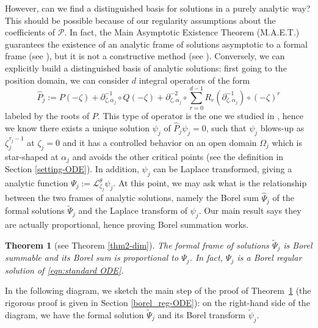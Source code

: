 \documentclass{article}
\theoremstyle{definition}
\newcommand{\series}[1]{\tilde{#1}}
\newcommand{\laplace}{\mathcal{L}}
\theoremstyle{plain}
\newtheorem{theorem}{Theorem}[section]
\begin{document}
However, can we find a distinguished basis for solutions in a purely analytic way? This should be possible because of our regularity assumptions about the coefficients of $\mathcal{P}$. In fact, the Main Asymptotic Existence Theorem (M.A.E.T.) guarantees the existence of an analytic frame of solutions asymptotic to a formal frame (see \cite[Theorem 3.1]{diverg-resurg-iii}), but it is not a constructive method (see \cite[Chapter 14]{balser}). Conversely, we can explicitly build a distinguished basis of analytic solutions: first going to the position domain, we can consider $d$ integral operators of the form 
\begin{equation}
\hat{P}_j:=P(-\zeta)+\partial_{\zeta,\alpha_j}^{-1}\circ Q(-\zeta)+\partial_{\zeta,\alpha_j}^{-2}\circ\sum_{r=0}^{d-1}R_r(\partial_{\zeta,\alpha_j}^{-1})\circ (-\zeta)^r
\end{equation}
labeled by the roots of $P$. This type of operator is the one we studied in \cite{reg-sing-volterra}, hence we know there exists a unique solution $\psi_j$ of $\hat{P}_j\psi_j=0$, such that $\psi_j$ blows-up as $\zeta_j^{\tau_j-1}$ at $\zeta_j=0$ and it has a controlled behavior on an open domain $\Omega_j$ which is star-shaped at $\alpha_j$ and avoids the other critical points (see the definition in Section \ref{setting-ODE}). In addition, $\psi_j$ can be Laplace transformed, giving a analytic function $\Psi_j:=\laplace_{\zeta_j}^{\theta}\psi_j$. 
At this point, we may ask what is the relationship between the two frames of analytic solutions, namely the Borel sum $\hat{\Psi}_j$ of the formal solutions $\series{\Psi}_j$ and the Laplace transform of $\psi_j$. Our main result says they are actually proportional, hence proving Borel summation works. 
\begin{theorem}[see Theorem \ref{thm2-dim}]\label{thm2}
The formal frame of solutions $\tilde{\Psi}_j$ is Borel summable and its Borel sum is proportional to $\Psi_j$. In fact, $\Psi_j$ is a Borel regular solution of \eqref{eqn:standard ODE}.  
\end{theorem}
In the following diagram, we sketch the main step of the proof of Theorem~\ref{thm2} (the rigorous proof is given in Section \ref{borel_reg-ODE}): on the right-hand side of the diagram, we have the formal solution $\series{\Psi }_j$ and its Borel transform $\series{\psi}_j$. %
\end{document}
